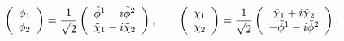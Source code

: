\begin{equation}
\left(\begin{array}{c}
	   \phi_1 \\
       \phi_2 
	      \end{array}\right)
={1 \over \sqrt2}
\left(\begin{array}{c}
 \tilde \phi^{1}-i \tilde \phi^{2} \\
 \tilde \chi_1 -i \tilde \chi_2  
	      \end{array}\right), 
\qquad
\left(\begin{array}{c}
	   \chi_1 \\
       \chi_2 
	      \end{array}\right)
={1 \over \sqrt2}
\left(\begin{array}{c}
 \tilde \chi_{1}+i \tilde \chi_{2} \\
 -\tilde \phi^1 -i \tilde \phi^2  
	      \end{array}\right).
\end{equation}

